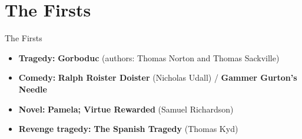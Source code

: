 \documentclass[
  12pt,
    progressbar=frametitle]{beamer}
\providecommand{\tightlist}{%
  \setlength{\itemsep}{0pt}\setlength{\parskip}{0pt}}
\begin{document}


\section{The Firsts}
\begin{frame}[allowframebreaks]
{The Firsts}
\begin{itemize}
\tightlist
\item
  \textbf{Tragedy:} \textbf{Gorboduc} (authors: Thomas Norton and Thomas
  Sackville)
\item
  \textbf{Comedy:} \textbf{Ralph Roister Doister} (Nicholas Udall) /
  \textbf{Gammer Gurton's Needle}
\item
  \textbf{Novel:} \textbf{Pamela; Virtue Rewarded} (Samuel Richardson)
\item
  \textbf{Revenge tragedy:} \textbf{The Spanish Tragedy} (Thomas Kyd)
\end{itemize}
\end{frame}
\end{document}
